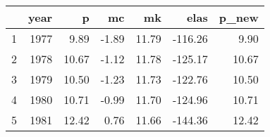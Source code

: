 \begin{table}[ht]
\centering
\begin{tabular}{rrrrrrr}
  \hline
 & year & p & mc & mk & elas & p\_new \\ 
  \hline
1 & 1977 & 9.89 & -1.89 & 11.79 & -116.26 & 9.90 \\ 
  2 & 1978 & 10.67 & -1.12 & 11.78 & -125.17 & 10.67 \\ 
  3 & 1979 & 10.50 & -1.23 & 11.73 & -122.76 & 10.50 \\ 
  4 & 1980 & 10.71 & -0.99 & 11.70 & -124.96 & 10.71 \\ 
  5 & 1981 & 12.42 & 0.76 & 11.66 & -144.36 & 12.42 \\ 
   \hline
\end{tabular}
\end{table}
